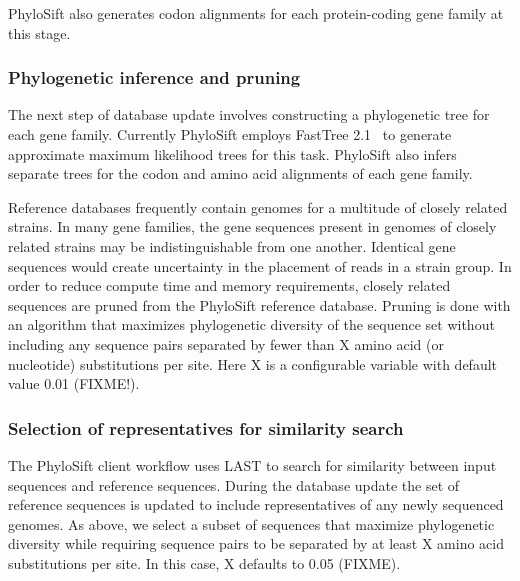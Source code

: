 \documentclass[10pt]{article}
\begin{document}
PhyloSift also generates codon alignments for each protein-coding gene family at this stage.
\subsubsection*{Phylogenetic inference and pruning}
The next step of database update involves constructing a phylogenetic tree for each gene family.
Currently PhyloSift employs FastTree 2.1~\cite{Price2010} to generate approximate maximum likelihood trees for this task.
PhyloSift also infers separate trees for the codon and amino acid alignments of each gene family. 

Reference databases frequently contain genomes for a multitude of closely related strains. 
In many gene families, the gene sequences present in genomes of closely related strains may be indistinguishable from one another.
Identical gene sequences would create uncertainty in the placement of reads in a strain group.
In order to reduce compute time and memory requirements, closely related sequences are pruned from the PhyloSift reference database. 
Pruning is done with an algorithm that maximizes phylogenetic diversity of the sequence set without including any sequence pairs separated by fewer than X amino acid (or nucleotide) substitutions per site.
Here X is a configurable variable with default value 0.01 (FIXME!).

\subsubsection*{Selection of representatives for similarity search}
The PhyloSift client workflow uses LAST to search for similarity between input sequences and reference sequences.
During the database update the set of reference sequences is updated to include representatives of any newly sequenced genomes.
As above, we select a subset of sequences that maximize phylogenetic diversity while requiring sequence pairs to be separated by at least X amino acid substitutions per site.
In this case, X defaults to 0.05 (FIXME).
\end{document}
